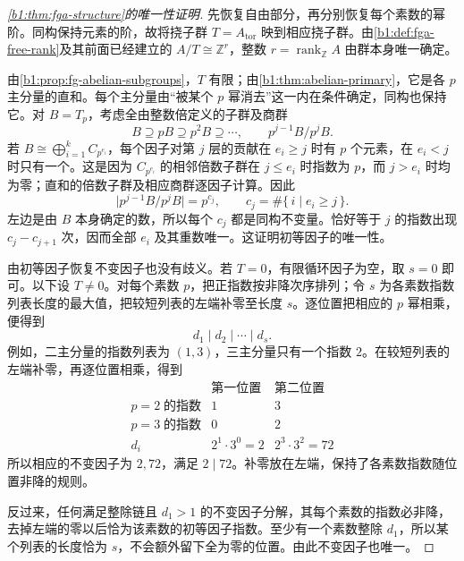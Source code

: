 \begin{proof}[\cref{b1:thm:fga-structure}的唯一性证明]
	先恢复自由部分，再分别恢复每个素数的幂阶。同构保持元素的阶，故将挠子群 \(T=A_{\mathrm{tor}}\) 映到相应挠子群。由\cref{b1:def:fga-free-rank}及其前面已经建立的 \(A/T\cong\mathbb Z^r\)，整数 \(r=\operatorname{rank}_{\mathbb Z}A\) 由群本身唯一确定。

	由\cref{b1:prop:fg-abelian-subgroups}，\(T\) 有限；由\cref{b1:thm:abelian-primary}，它是各 \(p\) 主分量的直和。每个主分量由“被某个 \(p\) 幂消去”这一内在条件确定，同构也保持它。对 \(B=T_p\)，考虑全由整数倍定义的子群及商群
	\[
		B\supseteq pB\supseteq p^2B\supseteq\cdots,\qquad p^{j-1}B/p^jB.
	\]
	若 \(B\cong\bigoplus_{i=1}^k C_{p^{e_i}}\)，每个因子对第 \(j\) 层的贡献在 \(e_i\ge j\) 时有 \(p\) 个元素，在 \(e_i<j\) 时只有一个。这是因为 \(C_{p^{e_i}}\) 的相邻倍数子群在 \(j\le e_i\) 时指数为 \(p\)，而 \(j>e_i\) 时均为零；直和的倍数子群及相应商群逐因子计算。因此
	\begin{equation}\label{b1:eq:primary-torsion-layers}
		\bigl|p^{j-1}B/p^jB\bigr|=p^{c_j}, \qquad c_j=\#\{\,i\mid e_i\ge j\,\}.
	\end{equation}
	左边是由 \(B\) 本身确定的数，所以每个 \(c_j\) 都是同构不变量。恰好等于 \(j\) 的指数出现 \(c_j-c_{j+1}\) 次，因而全部 \(e_i\) 及其重数唯一。这证明初等因子的唯一性。

	由初等因子恢复不变因子也没有歧义。若 \(T=0\)，有限循环因子为空，取 \(s=0\) 即可。以下设 \(T\ne0\)。对每个素数 \(p\)，把正指数按非降次序排列；令 \(s\) 为各素数指数列表长度的最大值，把较短列表的左端补零至长度 \(s\)。逐位置把相应的 \(p\) 幂相乘，便得到
	\[
		d_1\mid d_2\mid\cdots\mid d_s.
	\]
	例如，二主分量的指数列表为 \((1,3)\)，三主分量只有一个指数 \(2\)。在较短列表的左端补零，再逐位置相乘，得到
	\[
		\begin{array}{c|cc}
			& \text{第一位置} & \text{第二位置}\\ \hline p=2\;\text{的指数} & 1 & 3\\
			p=3\;\text{的指数} & 0 & 2\\ \hline d_i & 2^1\cdot3^0=2 & 2^3\cdot3^2=72
		\end{array}
	\]
	所以相应的不变因子为 \(2,72\)，满足 \(2\mid72\)。补零放在左端，保持了各素数指数随位置非降的规则。

	反过来，任何满足整除链且 \(d_1>1\) 的不变因子分解，其每个素数的指数必非降，去掉左端的零以后恰为该素数的初等因子指数。至少有一个素数整除 \(d_1\)，所以某个列表的长度恰为 \(s\)，不会额外留下全为零的位置。由此不变因子也唯一。
\end{proof}

